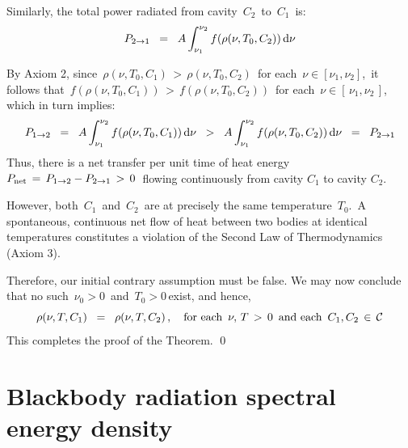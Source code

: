 \vskip 0.2cm
\noindent
Similarly, the total power radiated from cavity \,$C_{2}$\, to \,$C_{1}$\, is:
\begin{equation*}
P_{2 \rightarrow 1}
\;\; = \;\;
    A \int_{\nu_{1}}^{\nu_{2}} f(\rho(\nu, T_{0}, C_{2})) \, \textnormal{d}\nu
\end{equation*}

\vskip 0.2cm
\noindent
By Axiom 2, since
\,$\rho(\nu, T_{0}, C_{1}) \,>\, \rho(\nu, T_{0}, C_{2})$\,
for each 
\,$\nu \in [\nu_{1}, \nu_{2}]$,\,
it follows that
\,$f(\rho(\nu, T_{0}, C_{1})) \,>\, f(\rho(\nu, T_{0}, C_{2}))$\,
for each 
\,$\nu \in [\,\nu_{1}, \nu_{2}\,]$,\,
which in turn implies:
\begin{equation*}
P_{1 \rightarrow 2}
\;\; = \;\;
    A \int_{\nu_{1}}^{\nu_{2}} f(\rho(\nu, T_{0}, C_{1})) \, \textnormal{d}\nu
\;\; > \;\;
    A \int_{\nu_{1}}^{\nu_{2}} f(\rho(\nu, T_{0}, C_{2})) \, \textnormal{d}\nu
\;\; = \;\;
    P_{2 \rightarrow 1}
\end{equation*}
Thus, there is a net transfer per unit time of heat energy
\,$P_{\textnormal{net}} \,=\, P_{1 \to 2} - P_{2 \to 1} \,>\, 0$\,
flowing continuously from cavity $C_{1}$ to cavity $C_{2}$.

\vskip 0.2cm
\noindent
However, both \,$C_{1}$\, and \,$C_{2}$\, are
at precisely the same temperature \,$T_{0}$.\,
A spontaneous, continuous net flow of heat between two bodies
at identical temperatures constitutes a violation of
the Second Law of Thermodynamics (Axiom 3).

\vskip 0.2cm
\noindent
Therefore, our initial contrary assumption must be false.
We may now conclude that no such
\,$\nu_0 > 0$\, and \,$T_{0} > 0$\,exist,
and hence,
\begin{equation*}
\rho(\nu, T, C_{1})
\;\; = \;\;
    \rho(\nu, T, C_{2})\,,
\quad
\textnormal{for each \,$\nu,\, T \,>\, 0$\, and each \,$C_{1}, C_{2} \,\in\, \mathcal{C}$}
\end{equation*}
This completes the proof of the Theorem.
\qed


\clearpage
\section{Blackbody radiation spectral energy density}



